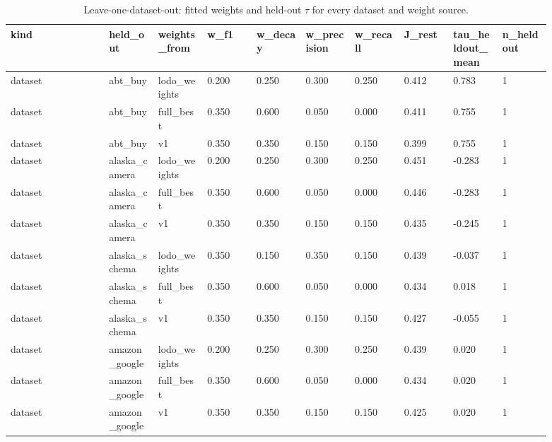 \begin{landscape}
\tiny
\setlength{\tabcolsep}{3pt}
\begin{longtable}{p{0.162\linewidth}p{0.081\linewidth}p{0.081\linewidth}p{0.081\linewidth}p{0.081\linewidth}p{0.081\linewidth}p{0.081\linewidth}p{0.081\linewidth}p{0.081\linewidth}p{0.081\linewidth}}
\caption{Leave-one-dataset-out: fitted weights and held-out $\tau$ for every dataset and weight source.}\label{tab:lodo_full}\\
\toprule
kind & held\_\allowbreak{}out & weights\_\allowbreak{}from & w\_\allowbreak{}f1 & w\_\allowbreak{}decay & w\_\allowbreak{}precision & w\_\allowbreak{}recall & J\_\allowbreak{}rest & tau\_\allowbreak{}heldout\_\allowbreak{}mean & n\_\allowbreak{}heldout \\
\midrule
dataset & abt\_\allowbreak{}buy & lodo\_\allowbreak{}weights & 0.200 & 0.250 & 0.300 & 0.250 & 0.412 & 0.783 & 1 \\
dataset & abt\_\allowbreak{}buy & full\_\allowbreak{}best & 0.350 & 0.600 & 0.050 & 0.000 & 0.411 & 0.755 & 1 \\
dataset & abt\_\allowbreak{}buy & v1 & 0.350 & 0.350 & 0.150 & 0.150 & 0.399 & 0.755 & 1 \\
dataset & alaska\_\allowbreak{}camera & lodo\_\allowbreak{}weights & 0.200 & 0.250 & 0.300 & 0.250 & 0.451 & -0.283 & 1 \\
dataset & alaska\_\allowbreak{}camera & full\_\allowbreak{}best & 0.350 & 0.600 & 0.050 & 0.000 & 0.446 & -0.283 & 1 \\
dataset & alaska\_\allowbreak{}camera & v1 & 0.350 & 0.350 & 0.150 & 0.150 & 0.435 & -0.245 & 1 \\
dataset & alaska\_\allowbreak{}schema & lodo\_\allowbreak{}weights & 0.350 & 0.150 & 0.350 & 0.150 & 0.439 & -0.037 & 1 \\
dataset & alaska\_\allowbreak{}schema & full\_\allowbreak{}best & 0.350 & 0.600 & 0.050 & 0.000 & 0.434 & 0.018 & 1 \\
dataset & alaska\_\allowbreak{}schema & v1 & 0.350 & 0.350 & 0.150 & 0.150 & 0.427 & -0.055 & 1 \\
dataset & amazon\_\allowbreak{}google & lodo\_\allowbreak{}weights & 0.200 & 0.250 & 0.300 & 0.250 & 0.439 & 0.020 & 1 \\
dataset & amazon\_\allowbreak{}google & full\_\allowbreak{}best & 0.350 & 0.600 & 0.050 & 0.000 & 0.434 & 0.020 & 1 \\
dataset & amazon\_\allowbreak{}google & v1 & 0.350 & 0.350 & 0.150 & 0.150 & 0.425 & 0.020 & 1 \\

\end{longtable}
\end{landscape}
